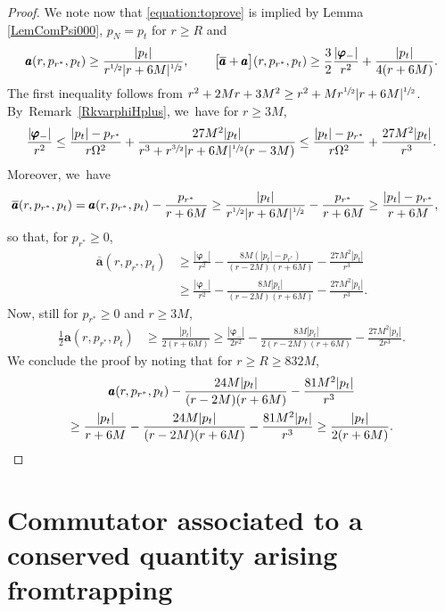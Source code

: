 \documentclass[JEP,XML,SOM,Unicode,published]{cedram}
\theoremstyle{plain}
\theoremstyle{definition}
\begin{document}
\begin{proof}
We note now that \eqref{equation:toprove} is implied by Lemma \ref{LemComPsi000}, $p_N=p_t$ for $r \geq R$ and
\[
\pmb{a}(r,p_{r^*},p_t) \geq \frac{|p_t|}{r^{\sfrac{1}{2}}|r+6M|^{\sfrac{1}{2}}},\qquad \bigl[\overline{\pmb{a}}+\pmb{a} \bigr](r,p_{r^*},p_t) \geq \frac{3}{2}\frac{|\pmb{\varphi}_-|}{r^2}+\frac{|p_t|}{4(r+6M)}.
\]
The first inequality follows from $r^2+2Mr+3M^2 \geq r^2+Mr^{\sfrac{1}{2}}|r+6M|^{\sfrac{1}{2}}$. By~Remark~\ref{RkvarphiHplus}, we~have for $r \geq 3M$,
\[
\frac{|\pmb{\varphi}_-|}{r^2} \leq \frac{|p_t|-p_{r^*} }{r \Omega^2} +\frac{27M^2 |p_t|}{r^3+r^{\sfrac{3}{2}}|r+6M|^{\sfrac{1}{2}}(r-3M)} \leq \frac{|p_t|-p_{r^*}}{r \Omega^2} +\frac{27M^2 |p_t|}{r^3}.
\]
Moreover, we~have
\begin{align*}
\overline{\pmb{a}}(r,p_{r^*},p_t) & = \pmb{a}(r,p_{r^*},p_t)-\frac{p_{r^*}}{r+6M} \geq \frac{|p_t|}{r^{\sfrac{1}{2}}|r+6M|^{\sfrac{1}{2}}}-\frac{p_{r^*}}{r+6M} \geq \frac{|p_t|-p_{r^*}}{r+6M},
\end{align*}
so that, for $p_{r^*} \geq 0$,
\begin{align*}
\overline{\pmb{a}}(r,p_{r^*},p_t) & \geq \frac{|\pmb{\varphi}_-|}{r^2}-\frac{8M(|p_t|-p_{r^*})}{(r-2M)(r+6M)}-\frac{27M^2 |p_t|}{r^3} \\
& \geq \frac{|\pmb{\varphi}_-|}{r^2}-\frac{8M|p_t|}{(r-2M)(r+6M)}-\frac{27M^2 |p_t|}{r^3}.
\end{align*}
Now, still for $p_{r^*} \geq 0$ and $r \geq 3M$,
\begin{align*}
\frac{1}{2}\pmb{a}(r,p_{r^*},p_t) & \geq \frac{|p_t|}{2(r+6M)} \geq \frac{|\pmb{\varphi}_-|}{2r^2}-\frac{8M|p_t|}{2(r-2M)(r+6M)} -\frac{27M^2 |p_t|}{2r^3}.
\end{align*}
We conclude the proof by noting that for $r \geq R \geq 832M$,
\begin{multline*}
\pmb{a}(r,p_{r^*},p_t)-\frac{24M|p_t|}{(r-2M)(r+6M)} -\frac{81M^2 |p_t|}{r^3} \\
\geq \frac{|p_t|}{r+6M}-\frac{24M|p_t|}{(r-2M)(r+6M)} -\frac{81M^2 |p_t|}{r^3} \geq \frac{|p_t|}{2(r+6M)}.\qedhere
\end{multline*}
\end{proof}

\section{Commutator associated to a conserved quantity arising\texorpdfstring{\\}{cr} from\nobreakspace trapping}\label{SecCotan}
\end{document}
